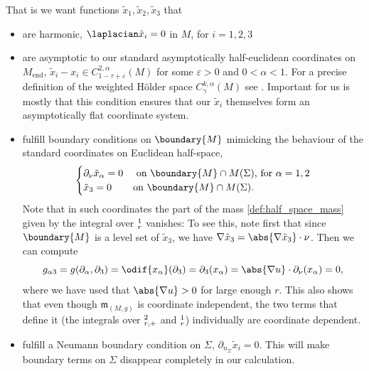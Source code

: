 \documentclass[titlepage,numbers=noenddot,oneside,%
cleardoublepage=empty,paper=a4,fontsize=11pt,%
english,%
]{scrartcl}
\let\sphere\relax
\newcommand{\sphere}{\mathbb{S}}
\newcommand{\Mend}{M_{\mathrm{end}}} %
\newcommand{\mass}[2]{\mathfrak{m}_{(#1,#2)}} %
\begin{document}
That is we want functions \( \tilde{x}_1,\tilde{x}_2,\tilde{x}_3 \) that
\begin{itemize}
    \item are harmonic, \ie \( \laplacian \tilde{x}_i=0 \) in \( M \), for \( i=1,2,3 \)
    \item are asymptotic to our standard asymptotically half-euclidean coordinates on \(  \Mend \), \ie \( \tilde{x}_i-x_i\in C_{1-\tau+\varepsilon}^{2,\alpha}(M) \) for some \( \varepsilon>0 \) and \( 0<\alpha<1 \). 
    For a precise definition of the weighted Hölder space \( C_\gamma^{k,\alpha}(M) \) see \cite[Section 3]{almarazPositiveMassTheorem2016}.
    Important for us is mostly that this condition ensures that our \( \tilde{x}_i \) themselves form an asymptotically flat coordinate system.


    \item fulfill boundary conditions on \( \boundary{M} \) mimicking the behaviour of the standard coordinates on Euclidean half-space, \ie
    \begin{equation*}
        \begin{cases}
            \partial_\nu \tilde{x}_\alpha=0 &\text{ on \( \boundary{M} \cap M(\Sigma) \), for \( \alpha=1,2 \)}\\
            \tilde{x}_3=0 &\text{on \( \boundary{M}\cap M(\Sigma) \)}.
        \end{cases}
    \end{equation*}
    Note that in such coordinates the part of the mass \cref{def:half_space_mass} given by the integral over \( \sphere^1_r \) vanishes: To see this, note first that since \( \boundary{M} \) is a level set of \( \tilde{x}_3 \), we have \( \nabla \tilde{x}_3=\abs{\nabla \tilde{x}_3}\cdot \nu \). Then we can compute
    \begin{equation}
        g_{\alpha 3}=g(\partial_\alpha,\partial_3)=\odif{x_{\alpha}}(\partial_3)=\partial_{3}(x_\alpha)=\abs{\nabla u}\cdot \partial_\nu (x_\alpha)=0,\label{eq:mass_expression_simplifies}
    \end{equation}
    where we have used that \( \abs{\nabla u}>0 \) for large enough \( r \). This also shows that even though \( \mass{M}{g} \) is coordinate independent, the two terms that define it (the integrals over \( \sphere^2_{r,+} \) and \( \sphere_r^1 \)) individually are coordinate dependent.

    \item fulfill a Neumann boundary condition on \( \Sigma \), \ie \( \partial_{n_\Sigma}\tilde{x}_i=0 \). This will make boundary terms on \( \Sigma \) disappear completely in our calculation.
\end{itemize} 
\end{document}
